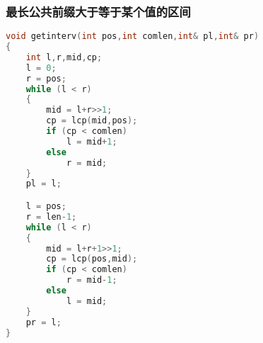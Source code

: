	\subsubsection{最长公共前缀大于等于某个值的区间}
		\begin{lstlisting}[language=c++]
void getinterv(int pos,int comlen,int& pl,int& pr)
{
	int l,r,mid,cp;
	l = 0;
	r = pos;
	while (l < r)
	{
		mid = l+r>>1;
		cp = lcp(mid,pos);
		if (cp < comlen)
			l = mid+1;
		else
			r = mid;
	}
	pl = l;

	l = pos;
	r = len-1;
	while (l < r)
	{
		mid = l+r+1>>1;
		cp = lcp(pos,mid);
		if (cp < comlen)
			r = mid-1;
		else
			l = mid;
	}
	pr = l;
}
		\end{lstlisting}